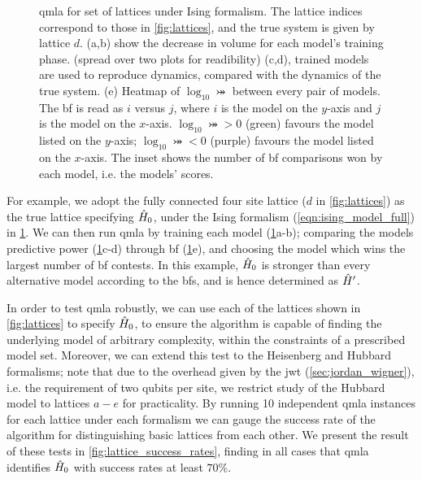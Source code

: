 \begin{figure}
    \caption[\gls{qmla} for set of lattices under Ising formalism]{
        \gls{qmla} for set of lattices under Ising formalism. 
        The lattice indices correspond to those in \cref{fig:lattices}, 
            and the true system is given by lattice $d$. 
        (a,b) show the decrease in \gls{volume} for each model's training phase. (spread over two plots for readibility) 
        (c,d), trained models are used to reproduce dynamics, compared with the dynamics of the
            true system. 
        (e) Heatmap of $\log_{10} \bij$ between every pair of models. The \gls{bf} is read as 
        $i$ versus $j$, where $i$ is the model on the $y$-axis and $j$ is the model on the $x$-axis. 
        $\log_{10} \bij > 0$ (green) favours the model listed on the $y$-axis;
        $\log_{10} \bij < 0$ (purple) favours the model listed on the $x$-axis.
        The inset shows the number of \gls{bf} comparisons won by each model, i.e. the models' scores. 
    }
    \label{fig:lattice_qmla_eg}
\end{figure}    

For example, we adopt the fully connected four site lattice ($d$ in \cref{fig:lattices})
    as the true lattice specifying $\hat{H}_0$, under the Ising formalism (\cref{eqn:ising_model_full}) in \cref{fig:lattice_qmla_eg}.
We can then run \gls{qmla} by training each model (\cref{fig:lattice_qmla_eg}a-b);
    comparing the models predictive power (\cref{fig:lattice_qmla_eg}c-d) 
    through \gls{bf} (\cref{fig:lattice_qmla_eg}e), 
    and choosing the model which wins the largest number of \gls{bf} contests. 
In this example, $\hat{H}_0$ is stronger than every alternative model according to the \glspl{bf}, 
    and is hence determined as $\hat{H}^{\prime}$. 

\par 
In order to test \gls{qmla} robustly, 
    we can use each of the lattices shown in \cref{fig:lattices} to specify $\hat{H}_0$, 
    to ensure the algorithm is capable of finding the underlying model of arbitrary complexity, 
    within the constraints of a prescribed model set\footnotemark. 
Moreover, we can extend this test to the Heisenberg and Hubbard formalisms; 
    note that due to the overhead given by the \gls{jwt} (\cref{sec:jordan_wigner}), i.e. the requirement of two qubits per site, 
    we restrict study of the Hubbard model to lattices $a-e$ for practicality. 
By running 10 independent \gls{qmla} instances for each lattice under each formalism
    we can gauge the success rate of the algorithm for distinguishing basic lattices from each other. 
We present the result of these tests in \cref{fig:lattice_success_rates},   
    finding in all cases that \gls{qmla} identifies $\hat{H}_0$ with success rates at least $70\%$. 

